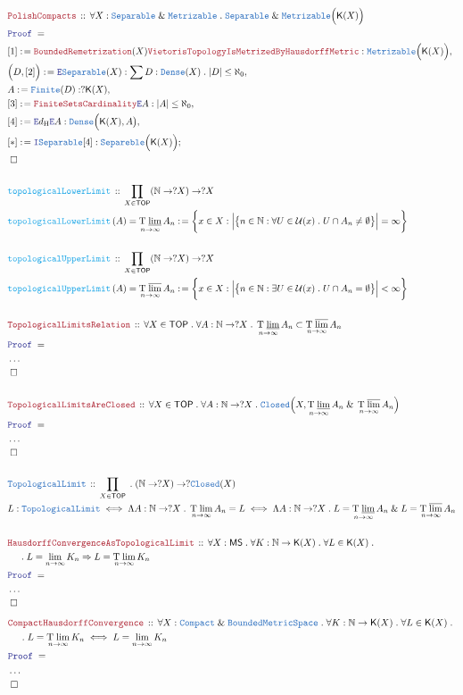 \documentclass[12pt]{scrartcl}
\newcommand{\TYPE}[1]{\textcolor{NavyBlue}{\mathtt{#1}}}
\newcommand{\FUNC}[1]{\textcolor{Cerulean}{\mathtt{#1}}}
\newcommand{\LOGIC}[1]{\textcolor{Blue}{\mathtt{#1}}}
\newcommand{\THM}[1]{\textcolor{Maroon}{\mathtt{#1}}}
\renewcommand{\.}{\; . \;}
\newcommand{\de}{: \kern 0.1pc =}
\newcommand{\Act}[1]{\left( #1 \right)}
\newcommand{\Theorem}[2]{& \THM{#1} \, :: \, #2 \\ & \Proof = \\ }
\newcommand{\DeclareType}[2]{& \TYPE{#1} \, :: \, #2 \\}
\newcommand{\DefineNamedType}[4]{& #1 : \TYPE{#2} \iff #3 \iff #4 \\}
\newcommand{\DeclareFunc}[2]{& \FUNC{#1} \, :: \, #2 \\}
\newcommand{\DefineNamedFunc}[4]{&  \FUNC{#1}\Act{#2} = #3 \de #4 \\}
\newcommand{\NewLine}{\\ & \kern 1pc}
\newcommand{\Page}[1]{ \begin{align*} #1 \end{align*}   }
\newcommand{\NoProof}{ & \ldots \\ \EndProof}
\renewcommand{\And}{\; \& \;}
\newcommand{\Imply}{\Rightarrow}
\newcommand{\Intro}{\LOGIC{I}}
\newcommand{\Elim}{\LOGIC{E}}
\newcommand{\Nat}{\mathbb{N} }
\newcommand{\Say}[3]{& #1 \de #2 : #3, \\}
\newcommand{\Conclude}[3]{& #1 \de #2 : #3; \\}
\newcommand{\QED}{\; \square}
\newcommand{\EndProof}{& \QED \\}
\newcommand{\Proof}{\LOGIC{Proof} \; }
\newcommand{\Compact}{\TYPE{Compact}}
\newcommand{\TOP}{\mathsf{TOP}}
\newcommand{\U}{\mathcal{U}}
\newcommand{\MS}{\mathsf{MS}}
\DeclareMathOperator*{\Tll}{{T\;\underline{lim}}}
\DeclareMathOperator*{\Tul}{{T\;\overline{lim}}}
\DeclareMathOperator*{\Tl}{{T\;lim}}
\newcommand{\K}{\mathsf{K}}
\begin{document}
\Page{
	\Theorem{PolishCompacts}
	{
		\forall X : \TYPE{Separable}\And\TYPE{Metrizable} \. 
		\TYPE{Separable} \And \TYPE{Metrizable}\Big( \K(X) \Big)
	}
	\Say{[1]}{\THM{BoundedRemetrization}(X)\THM{VietorisTopologyIsMetrizedByHausdorffMetric}}
	{
		\TYPE{Metrizable}\Big( \K(X) \Big)
	}
	\Say{\Big(D,[2]\Big)}{\Elim \TYPE{Separable}(X)}
	{
		\sum D : \TYPE{Dense}(X) \. 
		|D| \le \aleph_0
	}
	\Say{A}{\TYPE{Finite}(D)}
	{
		?\K(X)
	}
	\Say{[3]}{\THM{FiniteSetsCardinality}\Elim A}{|A| \le \aleph_0}
	\Say{[4]}{\Elim d_{\mathrm{H}}\Elim A}{\TYPE{Dense}\Big( \K(X) ,A \big)}
	\Conclude{[*]}{\Intro \TYPE{Separable}[4]}{\TYPE{Separeble}\Big( \K(X) \Big)}
	\EndProof
	\\
	\DeclareFunc{topologicalLowerLimit}{\prod_{X \in \TOP} (\Nat \to ?X) \to ?X}
	\DefineNamedFunc{topologicalLowerLimit}{A}{\Tll_{n \to \infty} A_n}
	{
		\bigg\{ x \in X : \Big|\big\{ n \in \Nat : \forall U \in \U(x) \. U \cap A_n \neq \emptyset \big\}\Big|=\infty   \bigg\}
	}
	\\
	\DeclareFunc{topologicalUpperLimit}{\prod_{X \in \TOP} (\Nat \to ?X) \to ?X}
	\DefineNamedFunc{topologicalUpperLimit}{A}{\Tul_{n \to \infty} A_n}
	{
		\bigg\{ x \in X : \Big|\big\{ n \in \Nat : \exists U \in \U(x) \. U \cap A_n = \emptyset \big\}\Big|<\infty   \bigg\}
	}
	\\
	\Theorem{TopologicalLimitsRelation}
	{
		\forall X \in \TOP \.
		\forall A : \Nat \to ?X \.
		\Tll_{n\to\infty} A_n \subset  \Tul_{n \to \infty} A_n
	}
	\NoProof
	\\
	\Theorem{TopologicalLimitsAreClosed}
	{
		\forall X \in \TOP \.
		\forall A : \Nat \to ?X \.
		\TYPE{Closed}\Big(X,\Tll_{n\to\infty} A_n \And \Tul_{n\to\infty} A_n \Big)
	}
	\NoProof
	\\
	\DeclareType{TopologicalLimit}
	{
		\prod_{X \in \TOP} \.
		(\Nat \to ?X) \to ?\TYPE{Closed}(X)
	}
	\DefineNamedType{L}{TopologicalLimit}{\Lambda A : \Nat \to ?X \. \Tl_{n\to\infty} A_n = L  }
	{
		\Lambda A : \Nat \to ?X \.  L = \Tll_{n \to \infty} A_n \And L = \Tul_{n \to \infty} A_n
	}	
	\\
	\Theorem{HausdorffConvergenceAsTopologicalLimit}
	{
		\forall X : \MS  \. 
		\forall K : \Nat \to \K(X) \.
		\forall L \in \K(X) \. \NewLine \.
		L = \lim_{n \to \infty} K_n
		\Imply
		L = \Tl_{n \to \infty} K_n
	}
	\NoProof
}\Page{
	\Theorem{CompactHausdorffConvergence}
	{
		\forall X : \Compact \And \TYPE{BoundedMetricSpace} \.
		\forall K : \Nat \to \K(X) \.
		\forall L \in \K(X) \. \NewLine \.
		L = \Tl_{n \to \infty} K_n
		\iff
		L = \lim_{n \to \infty} K_n
	}
	\NoProof
	\\
}
\end{document}
